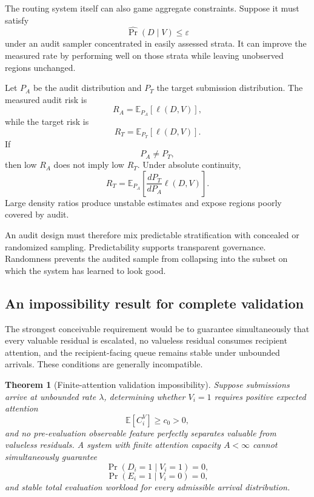\documentclass[11pt]{article}
\newtheorem{theorem}[definition]{Theorem}
\theoremstyle{definition}
\DeclareMathOperator{\Prob}{Pr}
\newcommand{\E}{\mathbb{E}}
\newcommand{\eps}{\varepsilon}
\begin{document}
The routing system itself can also game aggregate constraints. Suppose it must satisfy
\[
\widehat{\Prob}(D\mid V)\leq\eps
\]
under an audit sampler concentrated in easily assessed strata. It can improve the measured rate by performing well on those strata while leaving unobserved regions unchanged.

Let \(P_A\) be the audit distribution and \(P_T\) the target submission distribution. The measured audit risk is
\[
R_A
=
\E_{P_A}[\ell(D,V)],
\]
while the target risk is
\[
R_T
=
\E_{P_T}[\ell(D,V)].
\]
If
\[
P_A\neq P_T,
\]
then low \(R_A\) does not imply low \(R_T\). Under absolute continuity,
\[
R_T
=
\E_{P_A}
\left[
\frac{dP_T}{dP_A}\ell(D,V)
\right].
\]
Large density ratios produce unstable estimates and expose regions poorly covered by audit.

An audit design must therefore mix predictable stratification with concealed or randomized sampling. Predictability supports transparent governance. Randomness prevents the audited sample from collapsing into the subset on which the system has learned to look good.

\subsection{An impossibility result for complete validation}

The strongest conceivable requirement would be to guarantee simultaneously that every valuable residual is escalated, no valueless residual consumes recipient attention, and the recipient-facing queue remains stable under unbounded arrivals. These conditions are generally incompatible.

\begin{theorem}[Finite-attention validation impossibility]
Suppose submissions arrive at unbounded rate \(\lambda\), determining whether \(V_i=1\) requires positive expected attention
\[
\E[C_i^{V}]\geq c_0>0,
\]
and no pre-evaluation observable feature perfectly separates valuable from valueless residuals. A system with finite attention capacity \(A<\infty\) cannot simultaneously guarantee
\[
\Prob(D_i=1\mid V_i=1)=0,
\]
\[
\Prob(E_i=1\mid V_i=0)=0,
\]
and stable total evaluation workload for every admissible arrival distribution.
\end{theorem}
\end{document}
